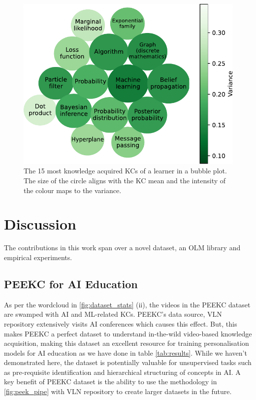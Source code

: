 \documentclass[letterpaper]{article} %
\begin{document}
\begin{figure}[]
\begin{center}
\centerline{\includegraphics[width=.7\linewidth]{visual_plot.pdf}}
 \caption{The 15 most knowledge acquired KCs of a learner in a bubble plot. The size of the circle aligns with the KC mean and the intensity of the colour maps to the variance.}
\label{fig:bubble}
\end{center}

\end{figure}



\section{Discussion}

The contributions in this work span over a novel dataset, an OLM library and empirical experiments. 

\subsection{PEEKC for AI Education}
As per the wordcloud in \figurename{ \ref{fig:dataset_stats} (ii)}, the videos in the PEEKC dataset are swamped with AI and ML-related KCs. PEEKC's data source, VLN repository extensively visits AI conferences which causes this effect. But, this makes PEEKC a perfect dataset to understand in-the-wild video-based knowledge acquisition, making this dataset an excellent resource for training personalisation models for AI education as we have done in table \ref{tab:results}. While we haven't demonstrated here, the dataset is potentially valuable for unsupervised tasks such as pre-requisite identification and hierarchical structuring of concepts in AI. A key benefit of PEEKC dataset is the ability to use the methodology in \figurename{ \ref{fig:peek_pipe}} with VLN repository to create larger datasets in the future.  
\end{document}
